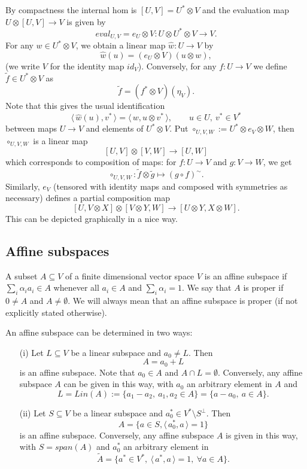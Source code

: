 \documentclass[12pt]{article}
\theoremstyle{definition}
\theoremstyle{remark}
\def\<{\langle\,}
\def\>{\,\rangle}
\begin{document}
By compactness the internal hom is  $[U,V]=U^*\otimes V$ and the evaluation map $U\otimes
[U,V]\to V$ is given by
\[
eval_{U,V}=e_U\otimes V: U\otimes U^*\otimes V\to V.
\]
For any  $w\in U^*\otimes V$, we obtain a linear map $\hat w: U\to V$ by
\[
\hat w(u)=(e_U\otimes V)(u\otimes w),
\]
(we write $V$ for the identity map  $id_V$). Conversely, for any $f:U\to V$ we define 
$\tilde f\in U^*\otimes V$ as 
\[
\tilde f=(f^*\otimes V)(\eta_V).
\]
Note that this gives the usual identification 
\[
\<\hat w(u),v^*\>=\<w,u\otimes v^*\>,\qquad u\in U,\
v^*\in V^*
\]
between maps $U\to V$ and elements of $U^*\otimes V$.  Put $\circ_{U,V,W}:=U^*\otimes e_V\otimes
W$, then $\circ_{U,V,W}$ is  a linear map
\[
[U,V]\otimes [V,W]\to [U,W]
\]
which corresponds to composition of maps: for $f:U\to V$ and $g:V\to W$, we get
\[
\circ_{U,V,W}: \tilde f\otimes \tilde g\mapsto (g\circ f)^\sim.
\]
Similarly, $e_V$ (tensored with identity maps and composed with  symmetries as necessary) defines a partial
composition map
\[
[U,V\otimes X]\otimes [V\otimes Y,W]\to [U\otimes Y, X\otimes W].
\]
This can be depicted graphically in a nice way.


\subsection{Affine subspaces}

A subset $A\subseteq V$ of a finite dimensional vector space $V$ is an affine subspace if 
$\sum_i\alpha_i a_i\in A$ whenever all $a_i\in A$ and $\sum_i\alpha_i=1$. We say that $A$
is proper if $0\ne A$ and $A\ne \emptyset$. We will always
mean  that an affine subspace is proper (if not explicitly stated otherwise).

An affine
subspace can be determined in two ways:
\begin{enumerate}
\item[(i)] Let $L\subseteq V$ be a linear subspace and $a_0\ne L$. Then 
\[
A=a_0+L
\]
is an affine subspace.  Note that $a_0\in A$ and $A\cap L=\emptyset$.
Conversely, any affine subspace $A$ can be given in this way, with $a_0$ an arbitrary element in $A$ and
\[
L=Lin(A):=\{a_1-a_2,\ a_1,a_2\in A\}=\{a-a_0,\ a\in A\}.
\]
\item[(ii)] Let $S\subseteq V$ be a linear subspace and $a_0^*\in V^*\setminus S^\perp$. Then
\[
A=\{a\in S, \<a_0^*,a\>=1\}
\]
is an affine subspace. Conversely, any affine subspace $A$ is given in this way, with
$S=span(A)$ and $a_0^*$ an arbitrary element in 
\[
\tilde A=\{a^*\in V^*,\ \<a^*,a\>=1,\ \forall a\in A\}.
\]
\end{enumerate}
\end{document}
